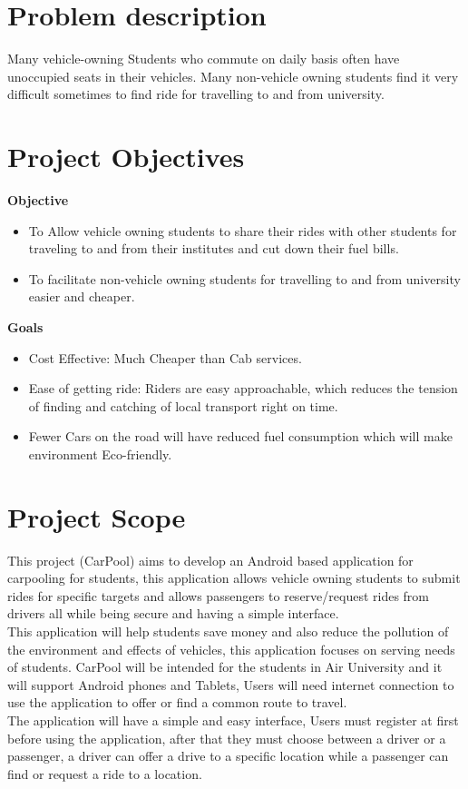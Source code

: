 \section{Problem description}
Many vehicle-owning Students who commute on daily basis often have unoccupied seats in their vehicles. Many non-vehicle owning students find it very difficult sometimes to find ride for travelling to and from university.

\section{Project Objectives}
\textbf{Objective}
\begin{itemize}

\item To Allow vehicle owning students to share their rides with other students for traveling to and from their institutes and cut down their fuel bills.

\item To facilitate non-vehicle owning students for travelling to and from university easier and cheaper.

\end{itemize}
\textbf{Goals}
\begin{itemize}

\item Cost Effective: Much Cheaper than Cab services.
\item Ease of getting ride: Riders are easy approachable, which reduces the tension of finding and catching of local transport right on time.
\item Fewer Cars on the road will have reduced fuel consumption which will make environment Eco-friendly.
\end{itemize}

\section{Project Scope}
This project (CarPool) aims to develop an Android based application for carpooling 
for students, this application allows vehicle owning students to submit rides for specific 
targets and allows passengers to reserve/request rides from drivers all while being secure 
and having a simple interface.
\\ This application will help students save money and also reduce the pollution of the 
environment and effects of vehicles, this application focuses on serving needs of students.
CarPool will be intended for the students in Air University and it will support Android phones 
and Tablets, Users will need internet connection to use the application to offer or find a 
common route to travel.
\\ The application will have a simple and easy interface, Users must register at first before 
using the application, after that they must choose between a driver or a passenger, a driver 
can offer a drive to a specific location while a passenger can find or request a ride to a location.

